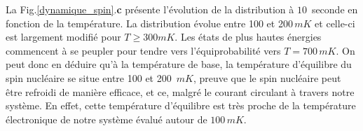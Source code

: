 La Fig.\ref{dynamique_spin}.\textbf{c} présente l'évolution de la distribution à $10\,$ seconde en fonction de la température. La distribution évolue entre 100 et 200$\,mK$ et celle-ci est largement modifié pour $T\geq 300mK$. Les états de plus hautes énergies commencent à se peupler pour tendre vers l'équiprobabilité vers $T=700\,mK$. On peut donc en déduire qu'à la température de base, la température d'équilibre du spin nucléaire se situe entre 100 et 200 $\,mK$, preuve que le spin nucléaire peut être refroidi de manière efficace, et ce, malgré le courant circulant à travers notre système. En effet, cette température d'équilibre est très proche de la température électronique de notre système évalué autour de $100\,mK$.
